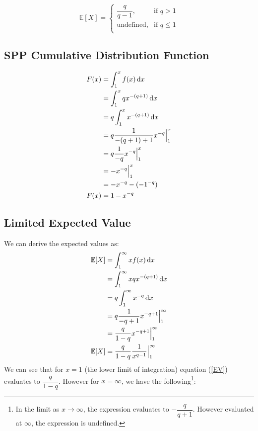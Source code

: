 \begin{equation}
\mathbb{E}[X]  = 
\begin{cases}
\dfrac{q}{q-1},& \text{if } q > 1\\
\text{undefined},& \text{if } q \leq 1\\         
\end{cases}
\end{equation}

\subsection{SPP Cumulative Distribution Function}\label{ParetoF}
\begin{align}
	F(x) &= \int_{1}^{x} f(x) \operatorname{d \!} x \nonumber\\
		&= \int_{1}^{x}qx^{-(q+1)} \operatorname{d \!} x\nonumber\\
		&= q \int_{1}^{x}x^{-(q+1)} \operatorname{d \!} x\nonumber\\
		&= q \frac{1}{-(q+1)+1} x^{-q} \Big|_{1}^{x}\nonumber\\
		&=  q \frac{1}{-q} x^{-q} \Big|_{1}^{x}\nonumber\\
		&=  - x^{-q}\Big|_{1}^{x}\nonumber\\
		&= -x^{-q} - (-1^{-q})\nonumber\\
	 F(x) &=  1 - x^{-q}
\end{align}

\subsection{Limited Expected Value}\label{sec:ParetoLEV}

We can derive the expected values as:
\begin{align}
\mathbb{E}[X] & = \int_{1}^{\infty}x f(x) \operatorname{d \!} x \nonumber\\
& = \int_{1}^{\infty}xqx^{-(q+1)} \operatorname{d \!} x\nonumber\\
& = q \int_{1}^{\infty}x^{-q} \operatorname{d \!} x\nonumber\\
& = q \frac{1}{-q+1} x^{-q+1} \Big|_{1}^{\infty}\nonumber\\
& = \frac{q}{1-q} x^{-q+1} \Big|_{1}^{\infty}\nonumber\\
\mathbb{E}[X] 	& = \frac{q}{1-q} \dfrac{1}{x^{q-1}} \Big|_{1}^{\infty}\label{EV}
\end{align}
We can see that for $x = 1$ (the lower limit of integration) equation (\ref{EV}) evaluates to $\dfrac{q}{1-q}$. However for $x = \infty$, we have the following\footnote{In the limit as $x\to\infty$, the expression evaluates to  $-\dfrac{q}{q+1}$. However evaluated at $\infty$, the expression is undefined.}:


